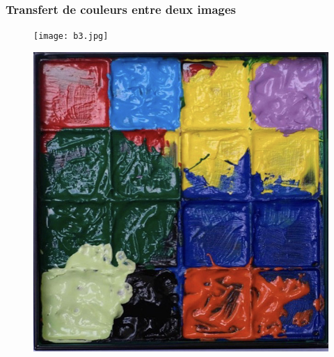 \documentclass{beamer}
\theoremstyle{definition}
\begin{document}
\begin{frame}
	\frametitle{Transfert de couleurs entre deux images}
	
					\begin{minipage}[t]{1\linewidth}
			\begin{minipage}{0.4\linewidth}\centering\begin{figure}
					\centering
					\texttt{[image: b3.jpg]}
			\end{figure}\end{minipage}\hfil \quad \quad
			\begin{minipage}{0.43\linewidth}\centering\begin{figure}
					\centering
					\includegraphics[scale=0.257]{b0.jpg}		
			\end{figure}\end{minipage}
		\end{minipage}
\end{frame}
\end{document}
